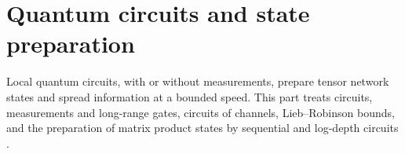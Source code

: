 \part{Quantum circuits and state preparation}
\label{part:circuits}

Local quantum circuits, with or without measurements, prepare tensor network
states and spread information at a bounded speed. This part treats circuits,
measurements and long-range gates, circuits of channels, Lieb--Robinson bounds,
and the preparation of matrix product states by sequential and log-depth
circuits \cite[Section~II.B]{Cirac2021Matrix}.
